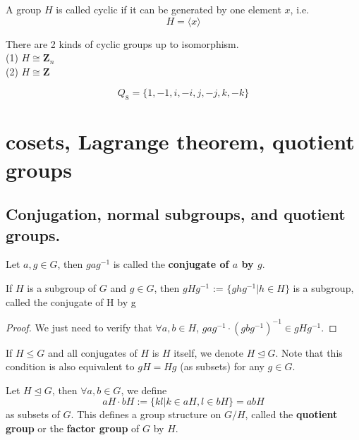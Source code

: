 \documentclass[11pt,fleqn]{book} %
\begin{document}
\begin{CJK}{UTF8}{gkai}
\begin{definition}
	 A group $H$ is called cyclic if it can be generated by one element $x$, i.e.
	\[H = \langle x\rangle \]	
\end{definition}

\begin{lemma}
	There are 2 kinds of cyclic groups up to isomorphism. \\
	(1) $H \cong \textbf{Z}_n$ \\
	(2) $H \cong \textbf{Z}$
\end{lemma}

\begin{definition}
	\[Q_8 = \{1,-1,i,-i,j,-j,k,-k\}\]
\end{definition}

\section{cosets, Lagrange theorem, quotient groups}
\subsection{Conjugation, normal subgroups, and quotient groups.}
\begin{definition}
	[conjugate] Let $a, g \in G$, then $gag^{-1}$ is called the {\bf conjugate of $a$ by $g$}. 
\end{definition}
\begin{definition}
	[定义-命题] If $H$ is a subgroup of $G$ and $g \in G$, then $gHg^{-1}$
	:= $\{ghg^{-1}
	| h \in H\}$ is a
	subgroup, called the conjugate of H by g
\end{definition}
\begin{proof}
	We just need to verify that $\forall a,b \in H$, $gag^{-1}\cdot(gbg^{-1})^{-1} \in gHg^{-1}$. 
\end{proof}

\begin{definition}
	 If $H \leq G$ and all conjugates of $H$ is $H$ itself, we denote $H \unlhd G$.
	Note that this condition is also equivalent to $gH = Hg$
	(as subsets) for any $g \in G$. 
\end{definition}

\begin{definition}
	 Let $H \unlhd G$, then $\forall a,b \in G$, we define
	\[aH \cdot bH:=\{kl | k\in aH, l \in bH\} = abH\]
	as subsets of $G$. This defines a group structure on $G/H$, called the {\bf quotient group} or the {\bf factor group} of $G$ by $H$.  
\end{definition}


\end{CJK}
\end{document}
